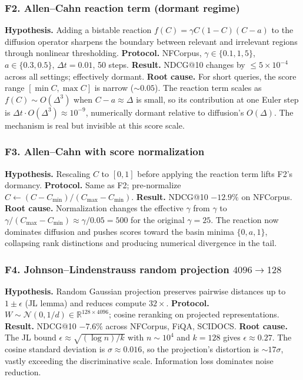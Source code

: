 \documentclass[review,1p,11pt]{elsarticle}
\begin{document}
\subsubsection*{F2. Allen--Cahn reaction term (dormant regime)}
\textbf{Hypothesis.} Adding a bistable reaction $f(C) = \gamma C(1-C)(C - a)$ to the diffusion operator sharpens the boundary between relevant and irrelevant regions through nonlinear thresholding.
\textbf{Protocol.} NFCorpus, $\gamma \in \{0.1, 1, 5\}$, $a \in \{0.3, 0.5\}$, $\Delta t = 0.01$, 50 steps.
\textbf{Result.} NDCG@10 changes by $\le 5 \times 10^{-4}$ across all settings; effectively dormant.
\textbf{Root cause.} For short queries, the score range $[\min C, \max C]$ is narrow ($\sim 0.05$). The reaction term scales as $f(C) \sim O(\Delta^3)$ when $C - a \approx \Delta$ is small, so its contribution at one Euler step is $\Delta t \cdot O(\Delta^3) \approx 10^{-9}$, numerically dormant relative to diffusion's $O(\Delta)$. The mechanism is real but invisible at this score scale.

\subsubsection*{F3. Allen--Cahn with score normalization}
\textbf{Hypothesis.} Rescaling $C$ to $[0,1]$ before applying the reaction term lifts F2's dormancy.
\textbf{Protocol.} Same as F2; pre-normalize $C \leftarrow (C - C_{\min})/(C_{\max} - C_{\min})$.
\textbf{Result.} NDCG@10 $-12.9\%$ on NFCorpus.
\textbf{Root cause.} Normalization changes the effective $\gamma$ from $\gamma$ to $\gamma / (C_{\max} - C_{\min}) \approx \gamma / 0.05 = 500$ for the original $\gamma = 25$. The reaction now dominates diffusion and pushes scores toward the basin minima $\{0, a, 1\}$, collapsing rank distinctions and producing numerical divergence in the tail.

\subsubsection*{F4. Johnson--Lindenstrauss random projection $4096 \to 128$}
\textbf{Hypothesis.} Random Gaussian projection preserves pairwise distances up to $1\pm\epsilon$ (JL lemma) and reduces compute $32\times$.
\textbf{Protocol.} $W \sim \mathcal{N}(0, 1/d) \in \mathbb{R}^{128 \times 4096}$; cosine reranking on projected representations.
\textbf{Result.} NDCG@10 $-7.6\%$ across NFCorpus, FiQA, SCIDOCS.
\textbf{Root cause.} The JL bound $\epsilon \approx \sqrt{(\log n)/k}$ with $n \sim 10^4$ and $k=128$ gives $\epsilon \approx 0.27$. The cosine standard deviation is $\sigma \approx 0.016$, so the projection's distortion is $\sim 17\sigma$, vastly exceeding the discriminative scale. Information loss dominates noise reduction.
\end{document}
